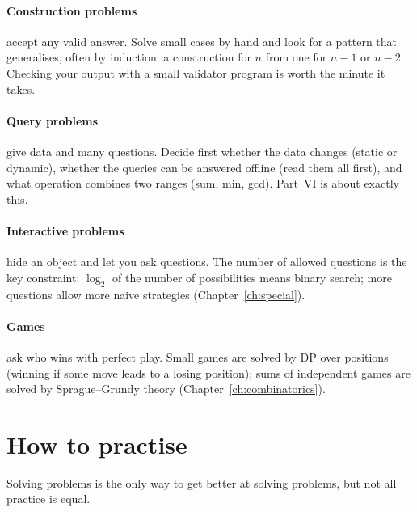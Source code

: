 \paragraph{Construction problems} accept any valid answer. Solve small cases by hand and look for a pattern that
generalises, often by induction: a construction for $n$ from one for $n - 1$ or $n - 2$. Checking your output with a small
validator program is worth the minute it takes.

\paragraph{Query problems} give data and many questions. Decide first whether the data changes (static or dynamic), whether
the queries can be answered offline (read them all first), and what operation combines two ranges (sum, min, gcd). Part~VI is
about exactly this.

\paragraph{Interactive problems} hide an object and let you ask questions. The number of allowed questions is the key
constraint: $\log_2$ of the number of possibilities means binary search; more questions allow more naive strategies
(Chapter~\ref{ch:special}).

\paragraph{Games} ask who wins with perfect play. Small games are solved by DP over positions (winning if some move leads to
a losing position); sums of independent games are solved by Sprague--Grundy theory (Chapter~\ref{ch:combinatorics}).

\section[How to practise]{How to practise \hfill \bronze}\label{sec:practise}

Solving problems is the only way to get better at solving problems, but not all practice is equal.

